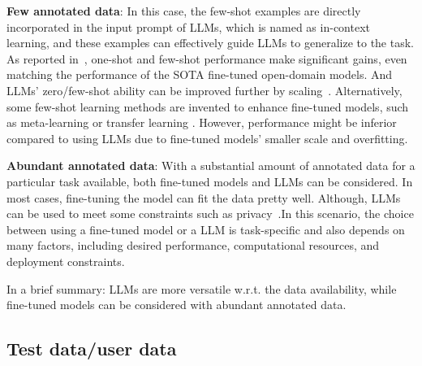 \documentclass[manuscript,screen, nonacm]{acmart}
\begin{document}
\noindent\textbf{Few annotated data}: In this case, the few-shot examples are directly incorporated in the input prompt of LLMs, which is named as in-context learning, and these examples can effectively guide LLMs to generalize to the task. As reported in~\cite{brown2020language}, one-shot and few-shot performance make significant gains, even matching the performance of the SOTA fine-tuned open-domain models. And LLMs' zero/few-shot ability can be improved further by scaling~\cite{brown2020language}.  %
 Alternatively, some few-shot learning methods are invented to enhance fine-tuned models, such as meta-learning \cite{lee2022meta} or transfer learning \cite{ruder2019transfer}. However, performance might be inferior compared to using LLMs due to fine-tuned models' smaller scale and overfitting. 

\noindent\textbf{Abundant annotated data}: With a substantial amount of annotated data for a particular task available, both fine-tuned models and LLMs can be considered. In most cases, fine-tuning the model can fit the data pretty well. Although, LLMs can be used to meet some constraints such as privacy~\cite{tang2023does}.In this scenario, the choice between using a fine-tuned model or a LLM is task-specific and also depends on many factors, including desired performance, computational resources, and deployment constraints. 
 
In a brief summary: LLMs are more versatile w.r.t. the data availability, while fine-tuned models can be considered with abundant annotated data.







\subsection{Test data/user data }
\label{sec:test_data}
\end{document}
